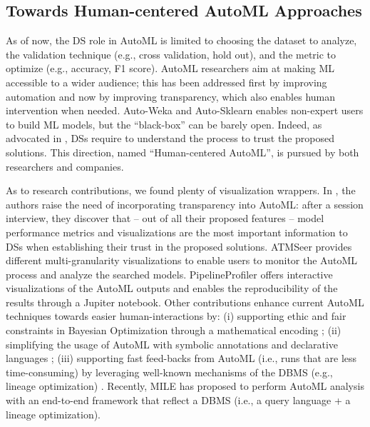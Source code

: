 \documentclass[5p,times]{elsarticle}
\begin{document}
\subsection{Towards Human-centered AutoML Approaches}
As of now, the DS role in AutoML is limited to choosing the dataset to analyze, the validation technique (e.g., cross validation, hold out), and the metric to optimize (e.g., accuracy, F1 score).
AutoML researchers aim at making ML accessible to a wider audience;
this has been addressed first by improving automation and now by improving transparency, which also enables human intervention when needed.
Auto-Weka \cite{kotthoff2019auto} and Auto-Sklearn \cite{feurer2019auto} enables non-expert users to build ML models, but the ``black-box'' can be barely open.
Indeed, as advocated in \cite{drozdal2020trust}, DSs require to understand the process to trust the proposed solutions.
This direction, named ``Human-centered AutoML'', is pursued by both researchers and companies.

As to research contributions, we found plenty of visualization wrappers.
In \cite{drozdal2020trust}, the authors raise the need of incorporating transparency into AutoML: after a session interview, they discover that -- out of all their proposed features -- model performance metrics and visualizations are the most important information to DSs when establishing their trust in the proposed solutions.
ATMSeer \cite{wang2019atmseer} provides different multi-granularity visualizations to enable users to monitor the AutoML process and analyze the searched models.
PipelineProfiler \cite{ono2020pipelineprofiler} offers interactive visualizations of the AutoML outputs and enables the reproducibility of the results through a Jupiter notebook.
Other contributions enhance current AutoML techniques towards easier human-interactions by: (i) supporting ethic and fair constraints in Bayesian Optimization through a mathematical encoding \cite{perrone2021fair, yaghini2021human}; (ii) simplifying the usage of AutoML with symbolic annotations \cite{peng2020pyglove} and declarative languages \cite{kraska2013mlbase}; (iii) supporting fast feed-backs from AutoML (i.e., runs that are less time-consuming) by leveraging well-known mechanisms of the DBMS (e.g., lineage optimization) \cite{vartak2015supporting, xin2018accelerating}.
Recently, MILE \cite{lee2020human} has proposed to perform AutoML analysis with an end-to-end framework that reflect a DBMS (i.e., a query language + a lineage optimization).
\end{document}
